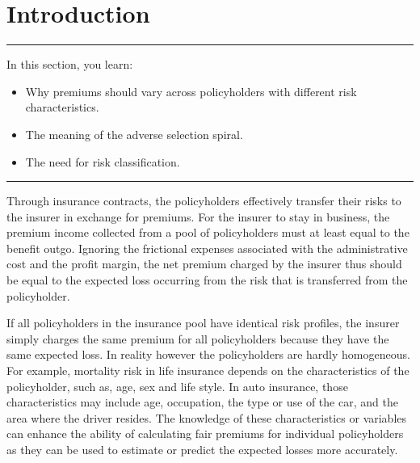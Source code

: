 \documentclass[]{book}
\theoremstyle{definition}
\theoremstyle{definition}
\theoremstyle{definition}
\theoremstyle{remark}
\begin{document}
\section{Introduction}\label{S:RC:Introduction}

\begin{center}\rule{0.5\linewidth}{\linethickness}\end{center}

In this section, you learn:

\begin{itemize}
\item
  Why premiums should vary across policyholders with different risk
  characteristics.
\item
  The meaning of the adverse selection spiral.
\item
  The need for risk classification.
\end{itemize}

\begin{center}\rule{0.5\linewidth}{\linethickness}\end{center}

Through insurance contracts, the policyholders effectively transfer
their risks to the insurer in exchange for premiums. For the insurer to
stay in business, the premium income collected from a pool of
policyholders must at least equal to the benefit outgo. Ignoring the
frictional expenses associated with the administrative cost and the
profit margin, the net premium charged by the insurer thus should be
equal to the expected loss occurring from the risk that is transferred
from the policyholder.

If all policyholders in the insurance pool have identical risk profiles,
the insurer simply charges the same premium for all policyholders
because they have the same expected loss. In reality however the
policyholders are hardly homogeneous. For example, mortality risk in
life insurance depends on the characteristics of the policyholder, such
as, age, sex and life style. In auto insurance, those characteristics
may include age, occupation, the type or use of the car, and the area
where the driver resides. The knowledge of these characteristics or
variables can enhance the ability of calculating fair premiums for
individual policyholders as they can be used to estimate or predict the
expected losses more accurately.
\end{document}
